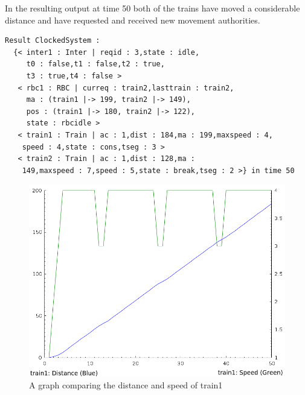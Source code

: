 In the resulting output at time 50 both of the trains have moved a considerable distance and have requested and received new movement authorities.
 
\begin{lstlisting}[caption = The result of rewriting initialstate2 for 50 time steps]
Result ClockedSystem :
  {< inter1 : Inter | reqid : 3,state : idle,
     t0 : false,t1 : false,t2 : true,
     t3 : true,t4 : false > 
   < rbc1 : RBC | curreq : train2,lasttrain : train2,
     ma : (train1 |-> 199, train2 |-> 149),
     pos : (train1 |-> 180, train2 |-> 122),
     state : rbcidle > 
   < train1 : Train | ac : 1,dist : 184,ma : 199,maxspeed : 4,
    speed : 4,state : cons,tseg : 3 > 
   < train2 : Train | ac : 1,dist : 128,ma :
    149,maxspeed : 7,speed : 5,state : break,tseg : 2 >} in time 50
\end{lstlisting}

\begin{figure}
\begin{center}
\includegraphics[scale=0.5]{t1graph.png}
\end{center}
\caption{A graph comparing the distance and speed of train1}
\end{figure}

